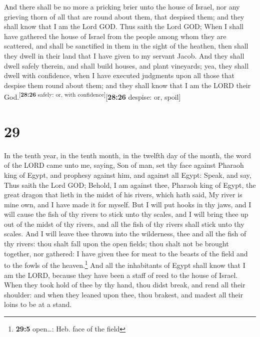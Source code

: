 And there shall be no more a pricking brier unto the
house of Israel, nor any grieving thorn of all that are round about
them, that despised them; and they shall know that I am the Lord GOD.
 Thus saith the Lord GOD; When I shall have gathered the
house of Israel from the people among whom they are scattered, and shall
be sanctified in them in the sight of the heathen, then shall they dwell
in their land that I have given to my servant Jacob.  And
they shall dwell safely therein, and shall build houses, and plant
vineyards; yea, they shall dwell with confidence, when I have executed
judgments upon all those that despise them round about them; and they
shall know that I am the LORD their
God.\textsuperscript{{[}\textbf{28:26} safely: or, with
confidence{]}}{[}\textbf{28:26} despise: or, spoil{]}

\hypertarget{section-28}{%
\section{29}\label{section-28}}

 In the tenth year, in the tenth month, in the twelfth day
of the month, the word of the LORD came unto me, saying, 
Son of man, set thy face against Pharaoh king of Egypt, and prophesy
against him, and against all Egypt:  Speak, and say, Thus
saith the Lord GOD; Behold, I am against thee, Pharaoh king of Egypt,
the great dragon that lieth in the midst of his rivers, which hath said,
My river is mine own, and I have made it for myself.  But
I will put hooks in thy jaws, and I will cause the fish of thy rivers to
stick unto thy scales, and I will bring thee up out of the midst of thy
rivers, and all the fish of thy rivers shall stick unto thy scales.
 And I will leave thee thrown into the wilderness, thee
and all the fish of thy rivers: thou shalt fall upon the open fields;
thou shalt not be brought together, nor gathered: I have given thee for
meat to the beasts of the field and to the fowls of the
heaven.\footnote{\textbf{29:5} open\ldots: Heb. face of the field}
 And all the inhabitants of Egypt shall know that I am the
LORD, because they have been a staff of reed to the house of Israel.
 When they took hold of thee by thy hand, thou didst
break, and rend all their shoulder: and when they leaned upon thee, thou
brakest, and madest all their loins to be at a stand.

